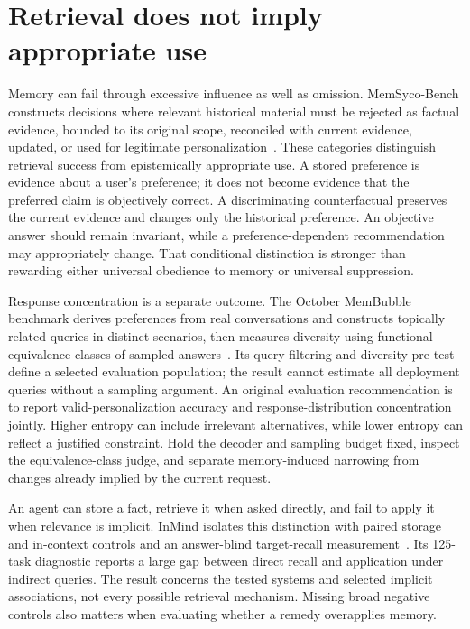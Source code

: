 \section{Retrieval does not imply appropriate use}\label{sec:C14:use}
Memory can fail through excessive influence as well as omission. MemSyco-Bench constructs decisions where relevant historical material must be rejected as factual evidence, bounded to its original scope, reconciled with current evidence, updated, or used for legitimate personalization~\cite{cumb2026memsycov3}. These categories distinguish retrieval success from epistemically appropriate use. A stored preference is evidence about a user's preference; it does not become evidence that the preferred claim is objectively correct. A discriminating counterfactual preserves the current evidence and changes only the historical preference. An objective answer should remain invariant, while a preference-dependent recommendation may appropriately change. That conditional distinction is stronger than rewarding either universal obedience to memory or universal suppression.

Response concentration is a separate outcome. The October MemBubble benchmark derives preferences from real conversations and constructs topically related queries in distinct scenarios, then measures diversity using functional-equivalence classes of sampled answers~\cite{tan2026membubble}. Its query filtering and diversity pre-test define a selected evaluation population; the result cannot estimate all deployment queries without a sampling argument. An original evaluation recommendation is to report valid-personalization accuracy and response-distribution concentration jointly. Higher entropy can include irrelevant alternatives, while lower entropy can reflect a justified constraint. Hold the decoder and sampling budget fixed, inspect the equivalence-class judge, and separate memory-induced narrowing from changes already implied by the current request.

An agent can store a fact, retrieve it when asked directly, and fail to apply it when relevance is implicit. InMind isolates this distinction with paired storage and in-context controls and an answer-blind target-recall measurement~\cite{inmind2026}. Its 125-task diagnostic reports a large gap between direct recall and application under indirect queries. The result concerns the tested systems and selected implicit associations, not every possible retrieval mechanism. Missing broad negative controls also matters when evaluating whether a remedy overapplies memory.


